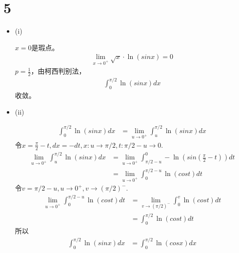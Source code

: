 \documentclass{article}
\begin{document}
\section*{5}
\begin{itemize}
  \item (i)

        $x = 0$是瑕点。
        \begin{align*}
          \lim\limits_{x \to 0^{+}} \sqrt{x} \cdot \ln (sin x) = 0
        \end{align*}
        $p = \frac{1}{2}$，由柯西判别法，
        \begin{align*}
          \int_{0}^{\pi/2} \ln (sin x) dx
        \end{align*}
        收敛。

  \item (ii)

        \begin{align*}
          \int_{0}^{\pi/2} \ln (sin x) dx
           & = \lim\limits_{u \to 0^+} \int_{u}^{\pi/2} \ln (sin x) dx
        \end{align*}
        令$x = \frac{\pi}{2} - t, dx = -dt, x: u \to \pi/2, t: \pi/2 - u \to 0$.
        \begin{align*}
          \lim\limits_{u \to 0^+} \int_{u}^{\pi/2} \ln (sin x) dx
           & = \lim\limits_{u \to 0^+} \int_{\pi/2 - u}^{0} - \ln (sin(\frac{\pi}{2} - t)) dt \\
           & = \lim\limits_{u \to 0^+} \int_{0}^{\pi/2 - u} \ln (cost) dt
        \end{align*}
        令$v = \pi/2 - u, u \to 0^+, v \to (\pi/2)^-$.
        \begin{align*}
          \lim\limits_{u \to 0^+} \int_{0}^{\pi/2 - u} \ln (cost) dt
           & = \lim\limits_{v \to (\pi/2)^-} \int_{0}^{v} \ln (cost) dt \\
           & = \int_{0}^{\pi/2} \ln (cost) dt
        \end{align*}
        所以
        \begin{align*}
          \int_{0}^{\pi/2} \ln (sin x) dx
           & = \int_{0}^{\pi/2} \ln (cos x) dx
        \end{align*}


\end{itemize}
\end{document}
